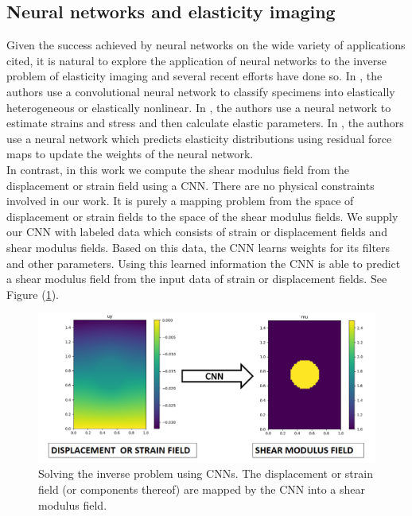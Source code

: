 \documentclass[12pt]{article}
\begin{document}
\subsection{Neural networks and elasticity imaging}
Given the success achieved by neural networks on the wide variety of applications cited, it is natural to explore the application of neural networks to the inverse problem of elasticity imaging and several recent efforts \cite{paper:pateloberai2019,misc:gu2020,paper:hoeriginsana2016} have done so. In \cite{paper:pateloberai2019}, the authors use a convolutional neural network to classify specimens into elastically heterogeneous or elastically nonlinear. In \cite{paper:hoeriginsana2016}, the authors use a neural network to estimate strains and stress and then calculate elastic parameters. In \cite{misc:gu2020}, the authors use a neural network which predicts elasticity distributions using residual force maps to update the weights of the neural network. \\In contrast, in this work we compute the shear modulus field from the displacement or strain field using a CNN. There are no physical constraints involved in our work. It is purely a mapping problem from the space of displacement or strain fields to the space of the shear modulus fields. We supply our CNN with labeled data which consists of strain or displacement fields and shear modulus fields. Based on this data, the CNN learns weights for its filters and other parameters. Using this learned information the CNN is able to predict a shear modulus field from the input data of strain or displacement fields. See Figure (\ref{fig:schematic_inv}).
%
\begin{figure}
   \centering
    \includegraphics[totalheight=5cm]{Figures/schematic_inv/schematic_inv.png}
  \caption{\label{fig:schematic_inv} Solving the inverse problem using CNNs. The displacement or strain field (or components thereof) are mapped by the CNN into a shear modulus field.}
\end{figure}
%
\end{document}
